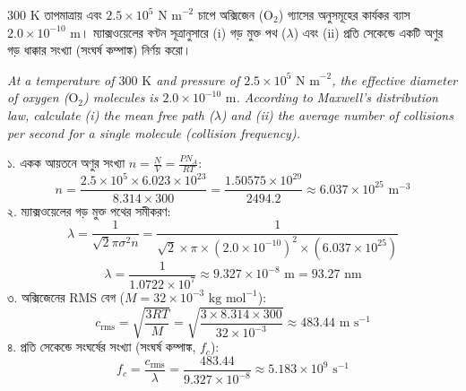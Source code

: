 \documentclass[12pt, a4paper]{article}
\begin{document}
\vspace{1.5em}

\begin{tcolorbox}[questionbox={প্রশ্ন (Question) 4}]
\noindent
$300\text{ K}$ তাপমাত্রায় এবং $2.5 \times 10^5\text{ N m}^{-2}$ চাপে অক্সিজেন ($\text{O}_2$) গ্যাসের অনুসমূহের কার্যকর ব্যাস $2.0 \times 10^{-10}\text{ m}$। ম্যাক্সওয়েলের বণ্টন সূত্রানুসারে (i) গড় মুক্ত পথ ($\lambda$) এবং (ii) প্রতি সেকেন্ডে একটি অণুর গড় ধাক্কার সংখ্যা (সংঘর্ষ কম্পাঙ্ক) নির্ণয় করো।

\vspace{0.8em}
\begin{english}
\noindent\textit{\color{darkgray}
At a temperature of $300\text{ K}$ and pressure of $2.5 \times 10^5\text{ N m}^{-2}$, the effective diameter of oxygen ($\text{O}_2$) molecules is $2.0 \times 10^{-10}\text{ m}$. According to Maxwell's distribution law, calculate (i) the mean free path ($\lambda$) and (ii) the average number of collisions per second for a single molecule (collision frequency).
}
\end{english}
\end{tcolorbox}

\vspace{1em}

\begin{tcolorbox}[solutionbox={সমাধান (Solution)}]
\noindent
১. একক আয়তনে অণুর সংখ্যা $n = \frac{N}{V} = \frac{P N_A}{R T}$:
\[ n = \frac{2.5 \times 10^5 \times 6.023 \times 10^{23}}{8.314 \times 300} = \frac{1.50575 \times 10^{29}}{2494.2} \approx 6.037 \times 10^{25}\text{ m}^{-3} \]
২. ম্যাক্সওয়েলের গড় মুক্ত পথের সমীকরণ:
\[ \lambda = \frac{1}{\sqrt{2} \pi \sigma^2 n} = \frac{1}{\sqrt{2} \times \pi \times (2.0 \times 10^{-10})^2 \times (6.037 \times 10^{25})} \]
\[ \lambda = \frac{1}{1.0722 \times 10^7} \approx 9.327 \times 10^{-8}\text{ m} = 93.27\text{ nm} \]
৩. অক্সিজেনের RMS বেগ ($M = 32 \times 10^{-3}\text{ kg mol}^{-1}$):
\[ c_{\text{rms}} = \sqrt{\frac{3 R T}{M}} = \sqrt{\frac{3 \times 8.314 \times 300}{32 \times 10^{-3}}} \approx 483.44\text{ m s}^{-1} \]
৪. প্রতি সেকেন্ডে সংঘর্ষের সংখ্যা (সংঘর্ষ কম্পাঙ্ক, $f_c$):
\[ f_c = \frac{c_{\text{rms}}}{\lambda} = \frac{483.44}{9.327 \times 10^{-8}} \approx 5.183 \times 10^9\text{ s}^{-1} \]
\end{tcolorbox}
\end{document}
